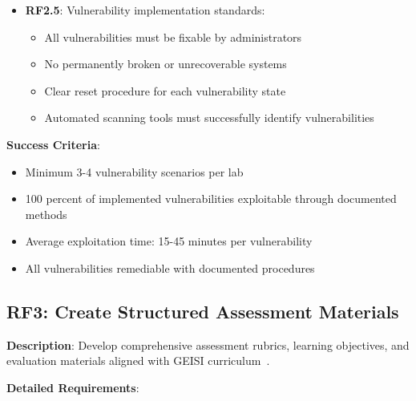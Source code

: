 \begin{itemize}
\item \textbf{RF2.5}: Vulnerability implementation standards:
\begin{itemize}
\item All vulnerabilities must be fixable by administrators
\item No permanently broken or unrecoverable systems
\item Clear reset procedure for each vulnerability state
\item Automated scanning tools must successfully identify vulnerabilities
\end{itemize}

\end{itemize}

\textbf{Success Criteria}:
\begin{itemize}
\item Minimum 3-4 vulnerability scenarios per lab
\item 100 percent of implemented vulnerabilities exploitable through documented methods
\item Average exploitation time: 15-45 minutes per vulnerability
\item All vulnerabilities remediable with documented procedures
\end{itemize}

\subsection{RF3: Create Structured Assessment Materials}

\textbf{Description}: Develop comprehensive assessment rubrics, learning objectives, and evaluation materials aligned with GEISI curriculum~\cite{geisi_curriculum}.

\textbf{Detailed Requirements}:

